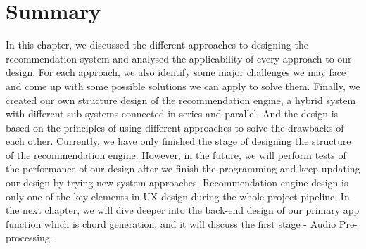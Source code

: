 \section{Summary}
In this chapter, we discussed the different approaches to designing the recommendation system and analysed the applicability of every approach to our design. For each approach, we also identify some major challenges we may face and come up with some possible solutions we can apply to solve them. Finally, we created our own structure design of the recommendation engine, a hybrid system with different sub-systems connected in series and parallel. And the design is based on the principles of using different approaches to solve the drawbacks of each other. Currently, we have only finished the stage of designing the structure of the recommendation engine. However, in the future, we will perform tests of the performance of our design after we finish the programming and keep updating our design by trying new system approaches. Recommendation engine design is only one of the key elements in UX design during the whole project pipeline. In the next chapter, we will dive deeper into the back-end design of our primary app function which is chord generation, and it will discuss the first stage - Audio Pre-processing.

